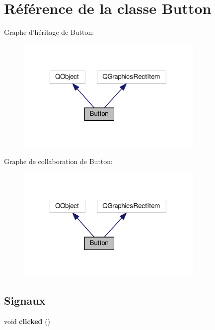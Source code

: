 \hypertarget{classButton}{\section{Référence de la classe Button}
\label{classButton}
}


Graphe d'héritage de Button\+:\nopagebreak
\begin{figure}[H]
\begin{center}
\leavevmode
\includegraphics[width=255pt]{d5/dbb/classButton__inherit__graph}
\end{center}
\end{figure}


Graphe de collaboration de Button\+:\nopagebreak
\begin{figure}[H]
\begin{center}
\leavevmode
\includegraphics[width=255pt]{d6/dbf/classButton__coll__graph}
\end{center}
\end{figure}
\subsection*{Signaux}
\begin{DoxyCompactItemize}
\item 
\hypertarget{classButton_a9e7ab4152cb1e7e3beb7f2842f32670c}{void {\bfseries clicked} ()}\label{classButton_a9e7ab4152cb1e7e3beb7f2842f32670c}

\end{DoxyCompactItemize}
